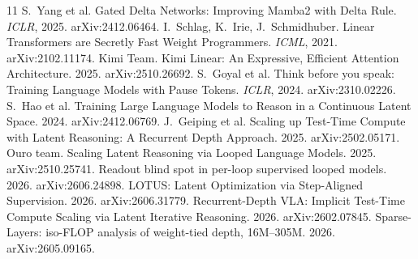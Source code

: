 \documentclass[10pt]{article}
\begin{document}
\begin{thebibliography}{11}\small
{} S.~Yang et al. Gated Delta Networks: Improving Mamba2 with Delta Rule. \emph{ICLR}, 2025. arXiv:2412.06464.
 I.~Schlag, K.~Irie, J.~Schmidhuber. Linear Transformers are Secretly Fast Weight Programmers. \emph{ICML}, 2021. arXiv:2102.11174.
 Kimi Team. Kimi Linear: An Expressive, Efficient Attention Architecture. 2025. arXiv:2510.26692.
 S.~Goyal et al. Think before you speak: Training Language Models with Pause Tokens. \emph{ICLR}, 2024. arXiv:2310.02226.
 S.~Hao et al. Training Large Language Models to Reason in a Continuous Latent Space. 2024. arXiv:2412.06769.
 J.~Geiping et al. Scaling up Test-Time Compute with Latent Reasoning: A Recurrent Depth Approach. 2025. arXiv:2502.05171.
 Ouro team. Scaling Latent Reasoning via Looped Language Models. 2025. arXiv:2510.25741.
 Readout blind spot in per-loop supervised looped models. 2026. arXiv:2606.24898.
 LOTUS: Latent Optimization via Step-Aligned Supervision. 2026. arXiv:2606.31779.
 Recurrent-Depth VLA: Implicit Test-Time Compute Scaling via Latent Iterative Reasoning. 2026. arXiv:2602.07845.
 Sparse-Layers: iso-FLOP analysis of weight-tied depth, 16M--305M. 2026. arXiv:2605.09165.
\end{thebibliography}
\end{document}
